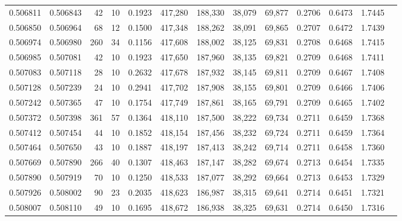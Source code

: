 \begin{tabular}{rrrrrrrrrrrrr}
0.506811 & 0.506843 &    42 &  10 &                                     0.1923 & 417,280 & 188,330 &  38,079 &  69,877 & 0.2706 & 0.6473 & 1.7445 \\
0.506850 & 0.506964 &    68 &  12 &                                     0.1500 & 417,348 & 188,262 &  38,091 &  69,865 & 0.2707 & 0.6472 & 1.7439 \\
0.506974 & 0.506980 &   260 &  34 &                                     0.1156 & 417,608 & 188,002 &  38,125 &  69,831 & 0.2708 & 0.6468 & 1.7415 \\
0.506985 & 0.507081 &    42 &  10 &                                     0.1923 & 417,650 & 187,960 &  38,135 &  69,821 & 0.2709 & 0.6468 & 1.7411 \\
0.507083 & 0.507118 &    28 &  10 &                                     0.2632 & 417,678 & 187,932 &  38,145 &  69,811 & 0.2709 & 0.6467 & 1.7408 \\
0.507128 & 0.507239 &    24 &  10 &                                     0.2941 & 417,702 & 187,908 &  38,155 &  69,801 & 0.2709 & 0.6466 & 1.7406 \\
0.507242 & 0.507365 &    47 &  10 &                                     0.1754 & 417,749 & 187,861 &  38,165 &  69,791 & 0.2709 & 0.6465 & 1.7402 \\
0.507372 & 0.507398 &   361 &  57 &                                     0.1364 & 418,110 & 187,500 &  38,222 &  69,734 & 0.2711 & 0.6459 & 1.7368 \\
0.507412 & 0.507454 &    44 &  10 &                                     0.1852 & 418,154 & 187,456 &  38,232 &  69,724 & 0.2711 & 0.6459 & 1.7364 \\
0.507464 & 0.507650 &    43 &  10 &                                     0.1887 & 418,197 & 187,413 &  38,242 &  69,714 & 0.2711 & 0.6458 & 1.7360 \\
0.507669 & 0.507890 &   266 &  40 &                                     0.1307 & 418,463 & 187,147 &  38,282 &  69,674 & 0.2713 & 0.6454 & 1.7335 \\
0.507890 & 0.507919 &    70 &  10 &                                     0.1250 & 418,533 & 187,077 &  38,292 &  69,664 & 0.2713 & 0.6453 & 1.7329 \\
0.507926 & 0.508002 &    90 &  23 &                                     0.2035 & 418,623 & 186,987 &  38,315 &  69,641 & 0.2714 & 0.6451 & 1.7321 \\
0.508007 & 0.508110 &    49 &  10 &                                     0.1695 & 418,672 & 186,938 &  38,325 &  69,631 & 0.2714 & 0.6450 & 1.7316 \\

\end{tabular}
